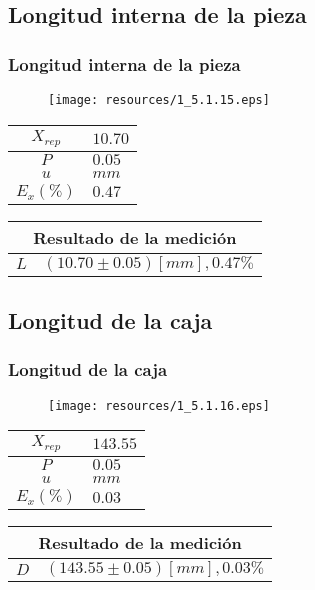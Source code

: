\documentclass[letter,11pt]{beamer}
\begin{document}
\subsection{Longitud interna de la pieza}
\begin{frame}
\frametitle{Longitud interna de la pieza}
\vspace*{0.8cm}
\begin{figure}
\centering
\texttt{[image: resources/1\_5.1.15.eps]}
\end{figure}
\vspace*{0.4cm}
\scriptsize
\begin{tabular}{|c|>{\centering}m{1.8cm}<{\centering}|}
\hline
$X_{rep}$ &  $10.70$ \tabularnewline \hline
      $P$ &   $0.05$ \tabularnewline \hline
      $u$ &     $mm$ \tabularnewline \hline
$E_x(\%)$ &   $0.47$ \tabularnewline \hline
\end{tabular}
\quad
\begin{tabular}{|c|>{\centering}m{5.7cm}<{\centering}|}
\hline
\multicolumn{2}{|c|}{\textbf{Resultado de la medición}} \\ \hline
$L$ & $( 10.70\pm0.05)[mm], 0.47\%$ \tabularnewline \hline
\end{tabular}
\end{frame}

\subsection{Longitud de la caja}
\begin{frame}
\frametitle{Longitud de la caja}
\vspace*{0.8cm}
\begin{figure}
\centering
\texttt{[image: resources/1\_5.1.16.eps]}
\end{figure}
\vspace*{0.4cm}
\scriptsize
\begin{tabular}{|c|>{\centering}m{1.8cm}<{\centering}|}
\hline
$X_{rep}$ & $143.55$ \tabularnewline \hline
      $P$ &   $0.05$ \tabularnewline \hline
      $u$ &     $mm$ \tabularnewline \hline
$E_x(\%)$ &   $0.03$ \tabularnewline \hline
\end{tabular}
\quad
\begin{tabular}{|c|>{\centering}m{5.7cm}<{\centering}|}
\hline
\multicolumn{2}{|c|}{\textbf{Resultado de la medición}} \\ \hline
$D$ & $(143.55\pm0.05)[mm], 0.03\%$ \tabularnewline \hline
\end{tabular}
\end{frame}
\end{document}
